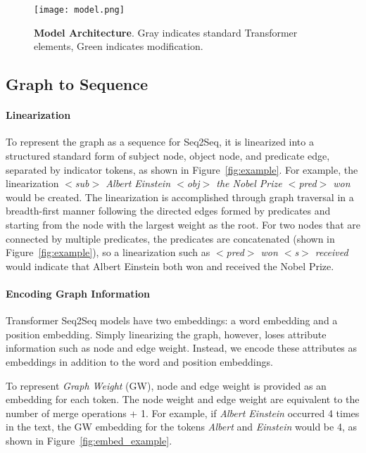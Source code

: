 \documentclass[11pt,a4paper]{article}
\begin{document}
\begin{figure}[t!]
    \centering
    \texttt{[image: model.png]}
    \caption{\textbf{Model Architecture}. Gray indicates standard Transformer elements, Green indicates modification.}
    \label{fig:model_architecture}
\end{figure}

\subsection{Graph to Sequence} 

\paragraph{Linearization} To represent the graph as a sequence for Seq2Seq, it is linearized into a structured standard form of subject node, object node, and predicate edge, separated by indicator tokens, as shown in Figure~\ref{fig:example}. For example, the linearization \textit{$<$sub$>$ Albert Einstein $<$obj$>$ the Nobel Prize $<$pred$>$ won} would be created. The linearization is accomplished through graph traversal in a breadth-first manner following the directed edges formed by predicates and starting from the node with the largest weight as the root. For two nodes that are connected by multiple predicates, the predicates are concatenated (shown in Figure~\ref{fig:example}), so a linearization such as \textit{$<$pred$>$ won $<$s$>$ received} would indicate that Albert Einstein both won and received the Nobel Prize. 

\paragraph{Encoding Graph Information} Transformer Seq2Seq models have two embeddings: a word embedding and a position embedding. Simply linearizing the graph, however, loses attribute information such as node and edge weight. Instead, we encode these attributes as embeddings in addition to the word and position embeddings. 

To represent \textit{Graph Weight} (GW), node and edge weight is provided as an embedding for each token. The node weight and edge weight are equivalent to the number of merge operations + 1. For example, if \textit{Albert Einstein} occurred 4 times in the text, the GW embedding for the tokens \textit{Albert} and \textit{Einstein} would be 4, as shown in Figure~\ref{fig:embed_example}. 
\end{document}
